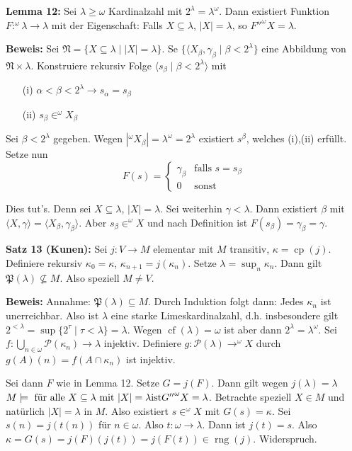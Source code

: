 \documentclass[a4paper,fontsize=11pt]{scrartcl}
\newcommand{\rng}{\operatorname{rng}}
\newcommand{\cf}{\operatorname{cf}}
\newcommand{\cp}{\operatorname{cp}}
\begin{document}
{\bf Lemma 12:} Sei $\lambda\ge\omega$ Kardinalzahl mit $2^\lambda=\lambda^\omega$.
	Dann existiert Funktion $F\colon ^\omega\lambda\to\lambda$ mit der Eigenschaft:
	Falls $X\subseteq\lambda$, $|X|=\lambda$, so ${F''}^\omega X=\lambda$.

	{\bf Beweis:} Sei $\mathfrak N =\{X\subseteq\lambda\mid |X|=\lambda\}$.
		Se $\{\langle X_\beta,\gamma_\beta\mid \beta<2^\lambda\}$ eine Abbildung von $\mathfrak N\times\lambda$.
		Konstruiere rekursiv Folge $\langle s_\beta\mid \beta< 2^\lambda\rangle$ mit
		\begin{itemize} \item[(i)] $\alpha<\beta< 2^\lambda\to s_\alpha= s_\beta$
			\item[(ii)] $s_\beta\in ^\omega X_\beta$
		\end{itemize}
		Sei $\beta< 2^\lambda$ gegeben. 
		Wegen $|^\omega X_\beta|=\lambda^\omega=2^\lambda$ existiert $s^\beta$, welches (i),(ii) erfüllt.
		Setze nun \[F(s) =\left\{ \begin{array}{cl} \gamma_\beta & \mbox{falls } s=s_\beta \\
			0 & \mbox{sonst} \end{array}\right.\]

		Dies tut's.
		Denn sei $X\subseteq\lambda$, $|X|=\lambda$.
		Sei weiterhin $\gamma<\lambda$. Dann existiert $\beta$ mit $\langle X,\gamma\rangle=\langle X_\beta,\gamma_\beta\rangle$.
		Aber $s_\beta\in ^\omega X$ und nach Definition ist $F(s_\beta)=\gamma_\beta=\gamma$.

{\bf Satz 13 (Kunen):} Sei $j\colon V\to M$ elementar mit $M$ transitiv, $\kappa=\cp(j)$.
	Definiere rekursiv $\kappa_0=\kappa$, $\kappa_{n+1} = j(\kappa_n)$.
	Setze $\lambda=\sup_n \kappa_n$.
	Dann gilt $\mathfrak P(\lambda)\not\subseteq M$.
	Also speziell $M\neq V$.

	{\bf Beweis:} Annahme: $\mathfrak P(\lambda)\subseteq M$. 
		Durch Induktion folgt dann: Jedes $\kappa_n$ ist unerreichbar.
		Also ist $\lambda$ eine starke Limeskardinalzahl, d.h. insbesondere gilt $2^{<\lambda}=\sup\{2^\tau\mid\tau<\lambda\}=\lambda$.
		Wegen $\cf(\lambda)=\omega$ ist aber dann $2^\lambda=\lambda^\omega$.
		Sei $f\colon\bigcup_{n\in\omega}\mathcal P(\kappa_n)\to\lambda$ injektiv.
		Definiere $g\colon \mathcal P(\lambda)\to ^\omega X$ durch $g(A)(n)=f(A\cap\kappa_n)$ ist injektiv.

		Sei dann $F$ wie in Lemma 12.
		Setze $G=j(F)$.
		Dann gilt wegen $j(\lambda)=\lambda$ $M\models \mbox{ für alle $X\subseteq \lambda$ mit $|X|=\lambda $ist$ {G''}^\omega X=\lambda$}$.
		Betrachte speziell $X\in M$ und natürlich $|X|=\lambda$ in $M$.
		Also existiert $s\in ^\omega X$ mit $G(s)=\kappa$.
		Sei $s(n)=j(t(n))$ für $n\in\omega$.
		Also $t\colon\omega\to\lambda$.
		Dann ist $j(t)=s$.
		Also $\kappa=G(s)=j(F)(j(t))=j(F(t))\in\rng(j)$. Widerspruch.
\end{document}
